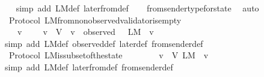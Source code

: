 \begin{isabellebody}
%
\isadelimproof
\ \ %
\endisadelimproof
%
\isatagproof
{}\isamarkupfalse%
\ {\isacharparenleft}simp\ add{\isacharcolon}\ L{\isacharunderscore}M{\isacharunderscore}def\ later{\isacharunderscore}from{\isacharunderscore}def{\isacharparenright}\isanewline
\ \ \isamarkupfalse%
\ from{\isacharunderscore}sender{\isacharunderscore}type{\isacharunderscore}for{\isacharunderscore}state\ \isamarkupfalse%
\ auto%
\endisatagproof
{\isafoldproof}%
%
\isadelimproof
\isanewline
%
\endisadelimproof
\isanewline
{}\isamarkupfalse%
\ {\isacharparenleft}\ Protocol{\isacharparenright}\ L{\isacharunderscore}M{\isacharunderscore}from{\isacharunderscore}non{\isacharunderscore}observed{\isacharunderscore}validator{\isacharunderscore}is{\isacharunderscore}empty\ {\isacharcolon}\isanewline
\ \ {\isachardoublequoteopen}{\isasymforall}\ {\isasymsigma}\ v{\isachardot}\ {\isasymsigma}\ {\isasymin}\ {\isasymSigma}\ {\isasymand}\ v\ {\isasymin}\ V\ {\isasymand}\ v\ {\isasymnotin}\ observed\ {\isasymsigma}\ {\isasymlongrightarrow}\ L{\isacharunderscore}M\ {\isasymsigma}\ v\ {\isacharequal}\ {\isasymemptyset}{\isachardoublequoteclose}\isanewline
%
\isadelimproof
\ \ %
\endisadelimproof
%
\isatagproof
{}\isamarkupfalse%
\ {\isacharparenleft}simp\ add{\isacharcolon}\ L{\isacharunderscore}M{\isacharunderscore}def\ observed{\isacharunderscore}def\ later{\isacharunderscore}def\ from{\isacharunderscore}sender{\isacharunderscore}def{\isacharparenright}%
\endisatagproof
{\isafoldproof}%
%
\isadelimproof
\isanewline
%
\endisadelimproof
\isanewline
{}\isamarkupfalse%
\ {\isacharparenleft}\ Protocol{\isacharparenright}\ L{\isacharunderscore}M{\isacharunderscore}is{\isacharunderscore}subset{\isacharunderscore}of{\isacharunderscore}the{\isacharunderscore}state\ {\isacharcolon}\isanewline
\ \ {\isachardoublequoteopen}{\isasymforall}\ {\isasymsigma}\ {\isasymin}\ {\isasymSigma}{\isachardot}\ {\isasymforall}\ v\ {\isasymin}\ V{\isachardot}\ L{\isacharunderscore}M\ {\isasymsigma}\ v\ {\isasymsubseteq}\ {\isasymsigma}{\isachardoublequoteclose}\isanewline
%
\isadelimproof
\ \ %
\endisadelimproof
%
\isatagproof
{}\isamarkupfalse%
\ {\isacharparenleft}simp\ add{\isacharcolon}\ L{\isacharunderscore}M{\isacharunderscore}def\ later{\isacharunderscore}from{\isacharunderscore}def\ from{\isacharunderscore}sender{\isacharunderscore}def{\isacharparenright}%
\endisatagproof
{\isafoldproof}%
%
\isadelimproof
\ \isanewline
%
\endisadelimproof
\isanewline
\isanewline
{}\isamarkupfalse%

\end{isabellebody}
